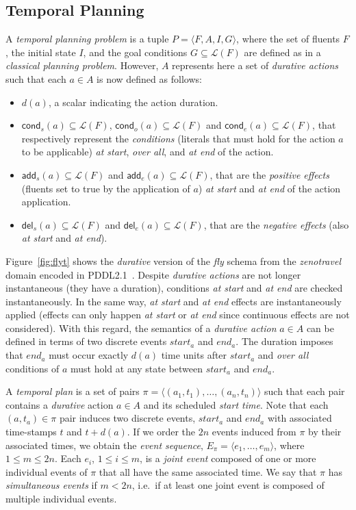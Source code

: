 \documentclass[letterpaper]{article} %
\newcommand{\tup}[1]{{\langle #1 \rangle}}
\newcommand{\del}{\mathsf{del}}     %
\newcommand{\add}{\mathsf{add}}     %
\newcommand{\cond}{\mathsf{cond}}   %
\begin{document}
\subsection{Temporal Planning}
A {\em temporal planning problem} is a tuple $P=\tup{F,A,I,G}$, where the set of fluents $F$, the initial state $I$, and the goal conditions $G\subseteq\mathcal{L}(F)$ are defined as in a {\em classical planning problem}. However, $A$ represents here a set of {\em durative actions} such that each $a\in A$ is now defined as follows:
\begin{itemize}
\item $d(a)$, a scalar indicating the action duration.
\item $\cond_s(a)\subseteq\mathcal{L}(F)$, $\cond_o(a)\subseteq\mathcal{L}(F)$ and $\cond_e(a)\subseteq\mathcal{L}(F)$, that respectively represent the {\em conditions} (literals that must hold for the action $a$ to be applicable) {\em at start}, {\em over all}, and {\em at end} of the action.

\item $\add_s(a)\subseteq\mathcal{L}(F)$ and $\add_e(a)\subseteq\mathcal{L}(F)$, that are the {\em positive effects} (fluents set to true by the application of $a$) {\em at start} and {\em at end} of the action application.
\item  $\del_s(a)\subseteq\mathcal{L}(F)$ and $\del_e(a)\subseteq\mathcal{L}(F)$, that are the {\em negative effects} (also {\em at start} and {\em at end}).
\end{itemize}

Figure~\ref{fig:flyt} shows the {\em durative} version of the {\em fly} schema from the {\em zenotravel} domain encoded in PDDL2.1~\cite{fox2003pddl2}. Despite {\em durative actions} are not longer instantaneous (they have a duration), conditions {\em at start} and {\em at end} are checked instantaneously. In the same way, {\em at start} and {\em at end} effects are instantaneously applied (effects can only happen {\em at start} or {\em at end} since continuous effects are not considered). With this regard, the semantics of a {\em durative action} $a\in A$ can be defined in terms of two discrete events $start_a$ and $end_a$. The duration imposes that $end_a$ must occur exactly $d(a)$ time units after $start_a$ and {\em over all} conditions of $a$ must hold at any state between $start_a$ and $end_a$.

A {\em temporal plan} is a set of pairs $\pi=\tup{(a_1,t_1), \ldots, (a_n,t_n)}$ such that each pair contains a {\em durative} action $a\in A$ and its scheduled {\em start time}. Note that each $(a,t_a)\in \pi$ pair induces two discrete events, $start_a$ and $end_a$ with associated time-stamps $t$ and $t+d(a)$. If we order the $2n$ events induced from $\pi$ by their associated times, we obtain the {\em event sequence}, $E_{\pi}=\langle e_1,\ldots,e_m\rangle$, where {\small $1\leq m\leq 2n$}. Each $e_i$, {\small $1\leq i\leq m$}, is a {\em joint event} composed of one or more individual events of $\pi$ that all have the same associated time. We say that $\pi$ has {\em simultaneous events} if $m<2n$, i.e.~if at least one joint event is composed of multiple individual events.
\end{document}
